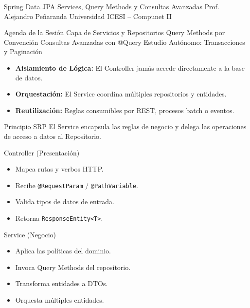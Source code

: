 \documentclass[aspectratio=169]{beamer}
\begin{document}

\titleSlideMinimalist
  {Spring Data JPA}
  {Services, Query Methods y Consultas Avanzadas}
  {Prof. Alejandro Pe\~naranda}
  {Universidad ICESI -- Compunet II}

\agendaSlideNumbered
  {Agenda de la Sesi\'on}
  {Capa de Servicios y Repositorios}
  {Query Methods por Convenci\'on}
  {Consultas Avanzadas con @Query}
  {Estudio Aut\'onomo: Transacciones y Paginaci\'on}



  {
    \begin{itemize}
      \item \textbf{Aislamiento de L\'ogica:} El Controller jam\'as accede directamente a la base de datos.
      \item \textbf{Orquestaci\'on:} El Service coordina m\'ultiples repositorios y entidades.
      \item \textbf{Reutilizaci\'on:} Reglas consumibles por REST, procesos batch o eventos.
    \end{itemize}
  }
  {Principio SRP}
  {El Service encapsula las reglas de negocio y delega las operaciones de acceso a datos al Repositorio.}

  {Controller (Presentaci\'on)}
  {
    \begin{itemize}
      \item Mapea rutas y verbos HTTP.
      \item Recibe \texttt{@RequestParam} / \texttt{@PathVariable}.
      \item Valida tipos de datos de entrada.
      \item Retorna \texttt{ResponseEntity<T>}.
    \end{itemize}
  }
  {Service (Negocio)}
  {
    \begin{itemize}
      \item Aplica las pol\'iticas del dominio.
      \item Invoca Query Methods del repositorio.
      \item Transforma entidades a DTOs.
      \item Orquesta m\'ultiples entidades.
    \end{itemize}
  }
\end{document}

